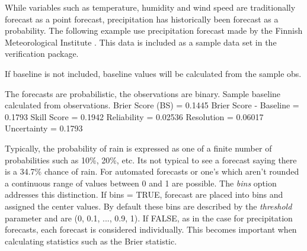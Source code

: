 \documentclass{article}
\begin{document}
While variables such as temperature, humidity and wind speed
are traditionally forecast as a point forecast, precipitation
has historically been forecast as a probability.  The following
example use precipitation forecast made by the Finnish Meteorological
Institute \cite{fin}.  This data is included as a sample data set in
the verification package.

\begin{Schunk}
\begin{Soutput}
If baseline is not included, baseline values  will be calculated from the  sample obs. 
\end{Soutput}
\begin{Soutput}
The forecasts are probabilistic, the observations are binary.
Sample baseline calculated from observations.
Brier Score (BS)           =  0.1445 
Brier Score - Baseline     =  0.1793 
Skill Score                =  0.1942 
Reliability                =  0.02536 
Resolution                 =  0.06017 
Uncertainty              =  0.1793 
\end{Soutput}
\end{Schunk}

Typically, the probability of rain is expressed as one of a finite
number of probabilities such as 10\%, 20\%, etc.  Its not typical to 
see a forecast saying there is a 34.7\% chance of rain.  For automated
forecasts  or one's which aren't rounded a continuous range
of values between 0 and 1 are possible.   The \textit{bins} option addresses this
distinction.  If bins = TRUE,  forecast are placed into bins and
assigned the center values.  By default these bins are described by
the \textit{threshold} parameter and are (0, 0.1, ..., 0.9, 1).  If
FALSE, as in the case for precipitation forecasts, each forecast is
considered individually.  This becomes important when calculating
statistics such as the Brier statistic.
\end{document}
